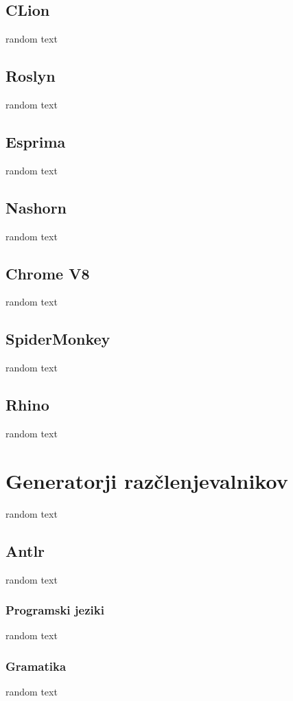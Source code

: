 \documentclass[a4paper, 12pt, tikz, border=5]{book}
\begin{document}
\section{CLion}
random text

\section{Roslyn}
random text

\section{Esprima}
random text

\section{Nashorn}
random text

\section{Chrome V8}
random text

\section{SpiderMonkey}
random text

\section{Rhino}
random text


\chapter{Generatorji razčlenjevalnikov} %
\label{chParserGenerators}
random text

\section{Antlr}
random text

\subsection{Programski jeziki}
random text

\subsection{Gramatika}
random text
\end{document}
